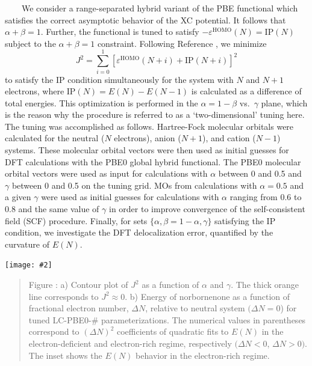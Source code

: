 \documentclass[landscape,a0b,final]{a0poster}
\newcommand{\bindent}{\ \ \ \ }
\newenvironment{poster}{
  \begin{center}
  \begin{minipage}[c]{0.98\textwidth}
}{
  \end{minipage} 
  \end{center}
}
\newcommand{\myfig}[3][0]{
\begin{center}
  \vspace{0.25cm}
  \texttt{[image: \#2]}
  \nobreak\medskip
\end{center}}
\newcommand{\mycaption}[1]{
  \vspace{0.25cm}
  \begin{quote}
    {{\sc Figure} \arabic{figure}: #1}
  \end{quote}
  \vspace{0.25cm}
  \stepcounter{figure}
}
\begin{document}
\begin{poster}
\begin{multicols}{3}
    \bindent We consider a range-separated hybrid variant of the PBE functional
    which satisfies the correct asymptotic behavior of the XC
    potential. It follows that $\alpha + \beta = 1$. Further, the
    functional is tuned to satisfy
    $-{\varepsilon}^{\text{HOMO}}(N)=\text{IP}(N)$ subject to the $\alpha
    + \beta = 1$ constraint. Following Reference
    , we minimize
    \begin{equation}
    J^2 =
    \sum_{i=0}^{1} [\varepsilon^{\text{HOMO}}(N+i)+\text{IP}(N+i)]^2 
    \label{eq:J2-criterion}
    \end{equation} 
    to satisfy the IP condition simultaneously for the system with $N$ and
    $N+1$ electrons, where $\text{IP}(N)= E(N)-E(N-1)$ is calculated as a
    difference of total energies. This optimization is performed in the
    $\alpha = 1-\beta$ vs.\ $\gamma$ plane, which is the reason why the
    procedure is referred to as a `two-dimensional' tuning here. The
    tuning was accomplished as follows. Hartree-Fock molecular orbitals
    were calculated for the neutral ($N$ electrons), anion ($N+1$), and
    cation ($N-1$) systems. These molecular orbital vectors were then used
    as initial guesses for DFT calculations with the PBE0 global hybrid
    functional. The PBE0 molecular orbital vectors were used as input for
    calculations with $\alpha$ between 0 and 0.5 and $\gamma$ between 0
    and 0.5 on the tuning grid. MOs from calculations with $\alpha = 0.5$
    and a given $\gamma$ were used as initial guesses for calculations
    with $\alpha$ ranging from 0.6 to 0.8 and the same value of $\gamma$
    in order to improve convergence of the self-consistent field (SCF)
    procedure.  Finally, for sets $\{\alpha,\beta = 1-\alpha,\gamma\}$
    satisfying the IP condition, we investigate the DFT delocalization
    error, quantified by the curvature of $E(N)$.
    \begin{center}
    \vspace*{1cm} %
    \myfig[0]{figures/norbornenone-tuning-correct}{1.0}
    \mycaption{ a) Contour plot of $J^2$ as a function of
    $\alpha$ and $\gamma$. The thick orange line corresponds to $J^2
    \approx 0$. b) Energy of norbornenone as a function
    of fractional electron number, ${\Delta}N$, relative to neutral
    system $({\Delta}N = 0$) for tuned LC-PBE0-\# parameterizations. The
    numerical values in parentheses correspond to $({\Delta}N)^2$
    coefficients of quadratic fits to $E(N)$ in the electron-deficient
    and electron-rich regime, respectively $({\Delta}N < 0$, ${\Delta}N
    > 0)$. The inset shows the $E(N)$ behavior in the electron-rich
    regime.}
    \end{center}


\end{multicols}
\end{poster}
\end{document}
